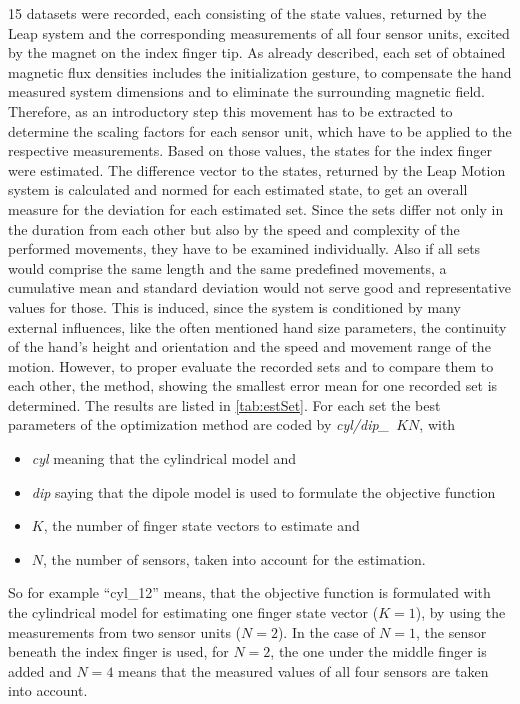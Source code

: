 15 datasets were recorded, each consisting of the state values, returned by the Leap system and the corresponding measurements of all four sensor units, excited by the magnet on the index finger tip. As already described, each set of obtained magnetic flux densities includes the initialization gesture, to compensate the hand measured system dimensions and to eliminate the surrounding magnetic field. Therefore, as an introductory step this movement has to be extracted to determine the scaling factors for each sensor unit, which have to be applied to the respective measurements. Based on those values, the states for the index finger were estimated. The difference vector to the states, returned by the Leap Motion system is calculated and normed for each estimated state, to get an overall measure for the deviation for each estimated set. Since the sets differ not only in the duration from each other but also by the speed and complexity of the performed movements, they have to be examined individually. Also if all sets would comprise the same length and the same predefined movements, a cumulative mean and standard deviation would not serve good and representative values for those. This is induced, since the system is conditioned by many external influences, like the often mentioned hand size parameters, the continuity of the hand's height and orientation and the speed and movement range of the motion. However, to proper evaluate the recorded sets and to compare them to each other, the method, showing the smallest error mean for one recorded set is determined. The results are listed in \ref{tab:estSet}. For each set the best parameters of the optimization method are coded by \mbox{\emph{cyl/dip\_ $ K N $}}, with
\begin{itemize}
\item \emph{cyl} meaning that the cylindrical model and 
\item \emph{dip} saying that the dipole model is used to formulate the objective function
\item $ K $, the number of finger state vectors to estimate and
\item $ N $, the number of sensors, taken into account for the estimation.
\end{itemize}
So for example ``cyl\_12'' means, that the objective function is formulated with the cylindrical model for estimating one finger state vector ($ K = 1 $), by using the measurements from two sensor units ($ N = 2 $). In the case of $ N = 1 $, the sensor beneath the index finger is used, for $ N = 2 $, the one under the middle finger is added and $ N = 4 $ means that the measured values of all four sensors are taken into account.
